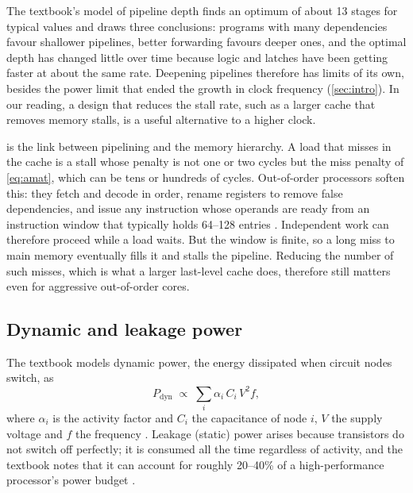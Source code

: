 The textbook's model of pipeline depth \cite[sec.~10.9.3]{sarangi2025basic} finds an optimum of about 13 stages for typical values and draws three conclusions: programs with many dependencies favour shallower pipelines, better forwarding favours deeper ones, and the optimal depth has changed little over time because logic and latches have been getting faster at about the same rate. Deepening pipelines therefore has limits of its own, besides the power limit that ended the growth in clock frequency (\cref{sec:intro}). In our reading, a design that reduces the stall rate, such as a larger cache that removes memory stalls, is a useful alternative to a higher clock.

 is the link between pipelining and the memory hierarchy. A load that misses in the cache is a stall whose penalty is not one or two cycles but the miss penalty of \cref{eq:amat}, which can be tens or hundreds of cycles. Out-of-order processors soften this: they fetch and decode in order, rename registers to remove false dependencies, and issue any instruction whose operands are ready from an instruction window that typically holds 64--128 entries \cite[sec.~10.11.4]{sarangi2025basic}. Independent work can therefore proceed while a load waits. But the window is finite, so a long miss to main memory eventually fills it and stalls the pipeline. Reducing the number of such misses, which is what a larger last-level cache does, therefore still matters even for aggressive out-of-order cores.

\subsection{Dynamic and leakage power}
\label{sec:power}

The textbook models dynamic power, the energy dissipated when circuit nodes switch, as
\begin{equation}
  P_{\mathrm{dyn}} \;\propto\; \sum_{i} \alpha_i\, C_i\, V^2 f,
  \label{eq:pdyn}
\end{equation}
where $\alpha_i$ is the activity factor and $C_i$ the capacitance of node $i$, $V$ the supply voltage and $f$ the frequency \cite[sec.~10.10.2]{sarangi2025basic}. Leakage (static) power arises because transistors do not switch off perfectly; it is consumed all the time regardless of activity, and the textbook notes that it can account for roughly 20--40\% of a high-performance processor's power budget \cite[sec.~10.10.3]{sarangi2025basic}.


